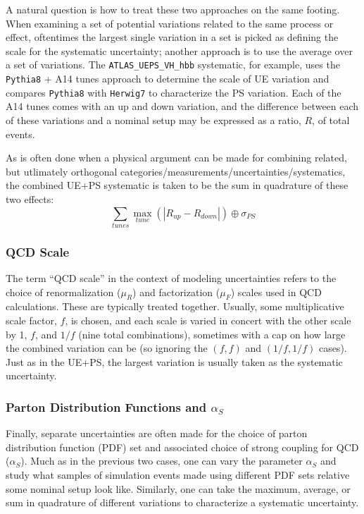A natural question is how to treat these two approaches on the same footing.  When examining a set of potential variations related to the same process or effect, oftentimes the largest single variation in a set is picked as defining the scale for the systematic uncertainty; another approach is to use the average over a set of variations.  The \texttt{ATLAS\_UEPS\_VH\_hbb} systematic, for example, uses the \texttt{Pythia8} + A14 tunes approach to determine the scale of UE variation and compares \texttt{Pythia8} with \texttt{Herwig7} to characterize the PS variation.  Each of the A14 tunes comes with an up and down variation, and the difference between each of these variations and a nominal setup may be expressed as a ratio, $R$, of total events.  

As is often done when a physical argument can be made for combining related, but utlimately orthogonal categories/measurements/uncertainties/systematics, the combined UE+PS systematic is taken to be the sum in quadrature of these two effects:
\begin{equation}
\sum_{tunes}\max_{tune}\left(\left|R_{up}-R_{down}\right|\right)\oplus\sigma_{PS}
\label{eqn:uepsvhhbb}
\end{equation}

\subsubsection{QCD Scale}
The term ``QCD scale'' in the context of modeling uncertainties refers to the choice of renormalization ($\mu_R$) and factorization ($\mu_F$) scales used in QCD calculations.  These are typically treated together.  Usually, some multiplicative scale factor, $f$, is chosen, and each scale is varied in concert with the other scale by 1, $f$, and $1/f$ (nine total combinations), sometimes with a cap on how large the combined variation can be (so ignoring the $\left(f,f\right)$ and $\left(1/f,1/f\right)$ cases).  Just as in the UE+PS, the largest variation is usually taken as the systematic uncertainty.

\subsubsection{Parton Distribution Functions and $\alpha_S$}
Finally, separate uncertainties are often made for the choice of parton distribution function (PDF) set and associated choice of strong coupling for QCD ($\alpha_S$).  Much as in the previous two cases, one can vary the parameter $\alpha_S$ and study what samples of simulation events made using different PDF sets relative some nominal setup look like.  Similarly, one can take the maximum, average, or sum in quadrature of different variations to characterize a systematic uncertainty.

